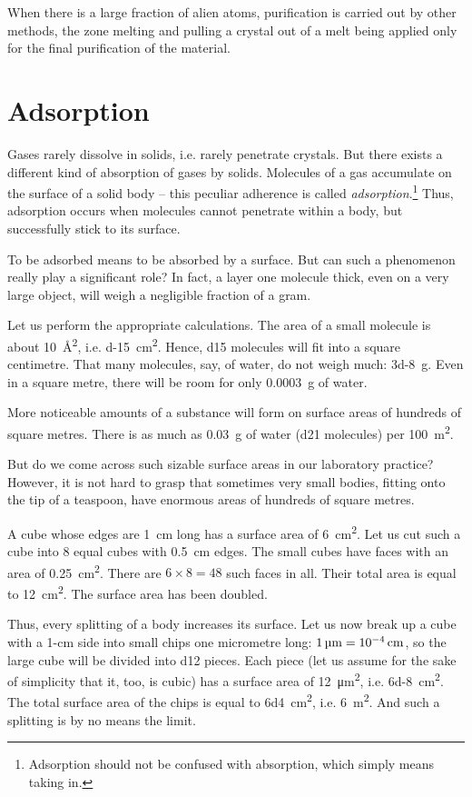 When there is a large fraction of alien atoms, purifi­cation is carried out by other methods, the zone melting and pulling a crystal out of a melt being applied only for the final purification of the material.

\section{Adsorption}

Gases rarely dissolve in solids, i.e. rarely penetrate crystals. But there exists a different kind of absorption of gases by solids.  Molecules of a gas accumulate on the surface of a solid body -- this peculiar adherence is called \emph{adsorption}.\footnote{Adsorption should not be confused with absorption, which simply means taking in.} Thus, adsorption occurs when molecules cannot penetrate within a body, but successfully stick to its surface.

To be adsorbed means to be absorbed by a surface. But can such a phenomenon really play a significant role? In fact, a layer one molecule thick, even on a very large object, will weigh a negligible fraction of a gram.

Let us perform the appropriate calculations. The area of a small molecule is about \SI{10}{\angstrom\squared}, i.e. \SI{d-15}{\centi\meter\squared}. Hence, \num{d15} molecules will fit into a square centimetre. That many molecules, say, of water, do not weigh much: \SI{3d-8}{\gram}. Even in a square metre, there will be room for only \SI{0.0003}{\gram} of water.

More noticeable amounts of a substance will form on surface areas of hundreds of square metres. There is as much as \SI{0.03}{\gram} of water (\num{d21} molecules) per \SI{100}{\meter\squared}.

But do we come across such sizable surface areas in our laboratory practice? However, it is not hard to grasp that sometimes very small bodies, fitting onto the tip of a teaspoon, have enormous areas of hundreds of square metres.

A cube whose edges are \SI{1}{\centi\meter} long has a surface area of \SI{6}{\centi\meter\squared}. Let us cut such a cube into 8 equal cubes with \SI{0.5}{\centi\meter} edges. The small cubes have faces with an area of \SI{0.25}{\centi\meter\squared}. There are $6 \times 8 = 48$ such faces in all. Their total area is equal to \SI{12}{\centi\meter\squared}. The surface area has been doubled.

Thus, every splitting of a body increases its surface. Let us now break up a cube with a 1-cm side into small chips one micrometre long: $\SI{1}{\micro\meter} = \SI{d-4}{\centi\meter}$, so the large cube will be divided into \num{d12} pieces. Each piece (let us assume for the sake of simplicity that it, too, is cubic) has a surface area of \SI{12}{\micro\meter\squared}, i.e. \SI{6d-8}{\centi\meter\squared}. The total surface area of the chips is equal to \SI{6d4}{\centi\meter\squared}, i.e. \SI{6}{\meter\squared}. And such a splitting is by no means the limit.

